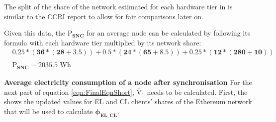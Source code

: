 The split of the share of the network estimated for each hardware tier in  is similar to the CCRI report \cite{CryptoCarbonRatingsInstitute2022TheNetwork} to allow for fair comparisons later on. 

Given this data, the $\boldsymbol{\mathrm{P}_{SNC}}$ for an average node can be calculated by following its formula with each hardware tier multiplied by its network share: \newline
\begin{align}
    &\boldsymbol{0.25*(36*(28 + 3.5)) + 0.5*(24*(65+8.5)) + 0.25*(12*(280+10))} \nonumber\\ \nonumber \\
    &\boldsymbol{{\mathrm{P}_{SNC}} = 2035.5} \text{ Wh} \nonumber
\end{align}



\textbf{Average electricity consumption of a node after synchronisation}
\label{postSyncEnergyImplementation}
For the next part of equation \ref{eqn:FinalEqnShort}, $\boldsymbol{\mathrm{\overline{V}_{1}}}$ needs to be calculated. First, the  shows the updated values for EL and CL clients' shares of the Ethereum network that will be used to calculate $\boldsymbol{\phi_{EL,CL}}$.  

